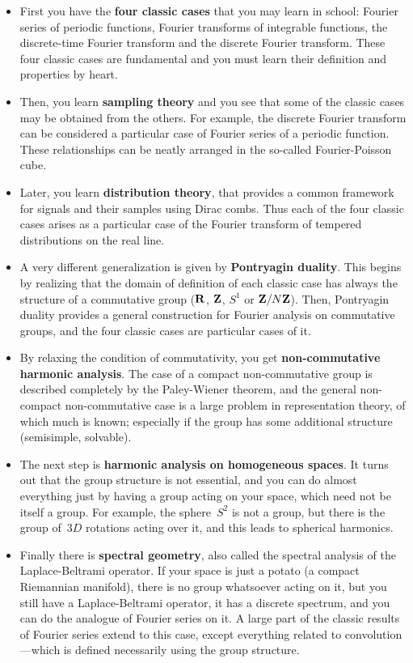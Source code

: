 \begin{itemize}
	\item First you have the {\bf four classic cases} that you may learn in
		school: Fourier series of periodic functions, Fourier
		transforms of integrable functions, the discrete-time Fourier
		transform and the discrete Fourier transform.
		These four classic cases are fundamental and you must learn
		their definition and properties by heart.
	\item Then, you learn {\bf sampling theory} and you see that
		some of the classic cases may be obtained from the others.
		For example, the discrete Fourier transform can be
		considered a particular case of Fourier series of a
		periodic function.
		These relationships can be neatly arranged in the
		so-called Fourier-Poisson cube.
	\item Later, you learn {\bf distribution theory}, that
		provides a common framework for signals and their
		samples using Dirac combs.  Thus each of the four
		classic cases arises as a particular case of the
		Fourier transform of tempered distributions on the
		real line.
	\item A very different generalization is given by {\bf
		Pontryagin duality}.  This begins by realizing that
		the domain of definition of each classic case has
		always the structure of a commutative group ($\mathbf{R}$,
		$\mathbf{Z}$, $S^1$ or $\mathbf{Z}/N\mathbf{Z}$).  Then, Pontryagin duality
		provides a general construction for Fourier analysis
		on commutative groups, and the four classic cases
		are particular cases of it.
	\item By relaxing the condition of commutativity, you get {\bf
		non-commutative harmonic analysis}.  The case of a compact
		non-commutative group is described completely by the
		Paley-Wiener theorem, and the general non-compact
		non-commutative case is a large problem in representation
		theory, of which much is known; especially if the group has
		some additional structure (semisimple, solvable).
	\item The next step is {\bf harmonic analysis on homogeneous
		spaces}.  It turns out that the group structure is not
		essential, and you can do almost everything just by having a
		group acting on your space, which need not be itself a group.
		For example, the sphere~$S^2$ is not a group, but there is the
		group of~$3D$ rotations acting over it, and this leads to
		spherical harmonics.
	\item Finally there is {\bf spectral geometry}, also called the
		spectral analysis of the Laplace-Beltrami operator.  If your
		space is just a potato (a compact Riemannian manifold), there
		is no group whatsoever acting on it, but you still have a
		Laplace-Beltrami operator, it has a discrete spectrum, and you
		can do the analogue of Fourier series on it.  A large part of
		the classic results of Fourier series extend to this case,
		except everything related to convolution---which is defined
		necessarily using the group structure.
\end{itemize}

